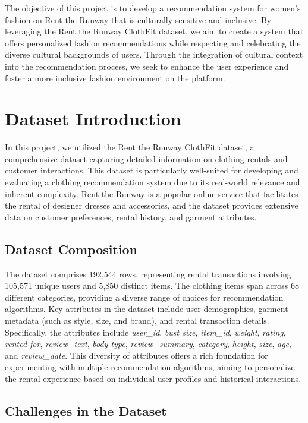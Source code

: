 \documentclass[conference]{IEEEtran}
\begin{document}
The objective of this project is to develop a recommendation system for women's fashion on Rent the Runway that is culturally sensitive and inclusive. By leveraging the Rent the Runway ClothFit dataset, we aim to create a system that offers personalized fashion recommendations while respecting and celebrating the diverse cultural backgrounds of users. Through the integration of cultural context into the recommendation process, we seek to enhance the user experience and foster a more inclusive fashion environment on the platform.

\section{Dataset Introduction}

In this project, we utilized the Rent the Runway ClothFit dataset, a comprehensive dataset capturing detailed information on clothing rentals and customer interactions. This dataset is particularly well-suited for developing and evaluating a clothing recommendation system due to its real-world relevance and inherent complexity. Rent the Runway is a popular online service that facilitates the rental of designer dresses and accessories, and the dataset provides extensive data on customer preferences, rental history, and garment attributes.

\subsection{Dataset Composition}

The dataset comprises 192,544 rows, representing rental transactions involving 105,571 unique users and 5,850 distinct items. The clothing items span across 68 different categories, providing a diverse range of choices for recommendation algorithms. Key attributes in the dataset include user demographics, garment metadata (such as style, size, and brand), and rental transaction details. Specifically, the attributes include \textit{user\_id}, \textit{bust size}, \textit{item\_id}, \textit{weight}, \textit{rating}, \textit{rented for}, \textit{review\_text}, \textit{body type}, \textit{review\_summary}, \textit{category}, \textit{height}, \textit{size}, \textit{age}, and \textit{review\_date}. This diversity of attributes offers a rich foundation for experimenting with multiple recommendation algorithms, aiming to personalize the rental experience based on individual user profiles and historical interactions.

\subsection{Challenges in the Dataset}
\end{document}
